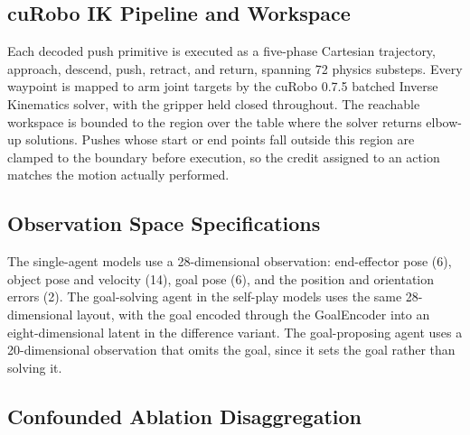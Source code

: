 \subsection{cuRobo IK Pipeline and Workspace}
\label{app:ik}

Each decoded push primitive is executed as a five-phase Cartesian trajectory,
approach, descend, push, retract, and return, spanning 72 physics substeps. Every
waypoint is mapped to arm joint targets by the cuRobo 0.7.5 batched Inverse
Kinematics solver, with the gripper held closed throughout. The reachable
workspace is bounded to the region over the table where the solver returns
elbow-up solutions. Pushes whose start or end points fall outside this region are
clamped to the boundary before execution, so the credit assigned to an action
matches the motion actually performed.

\subsection{Observation Space Specifications}
\label{app:obs}

The single-agent models use a 28-dimensional observation: end-effector pose (6),
object pose and velocity (14), goal pose (6), and the position and orientation
errors (2). The goal-solving agent in the self-play models uses the same
28-dimensional layout, with the goal encoded through the GoalEncoder into an
eight-dimensional latent in the difference variant. The goal-proposing agent uses
a 20-dimensional observation that omits the goal, since it sets the goal rather
than solving it.

\subsection{Confounded Ablation Disaggregation}
\label{app:confound}

